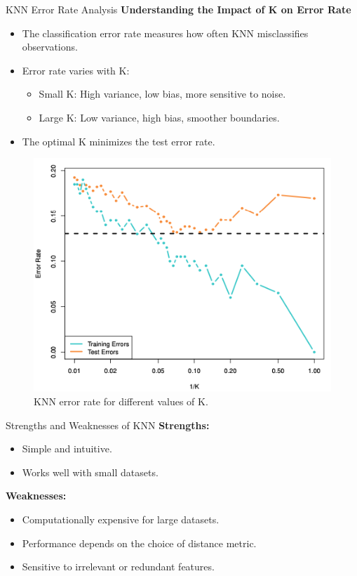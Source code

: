 \documentclass[aspectratio=169,xcolor=dvipsnames]{beamer}
\begin{document}
\begin{frame}{KNN Error Rate Analysis}
    \textbf{Understanding the Impact of K on Error Rate}
    \begin{itemize}
        \item The classification error rate measures how often KNN misclassifies observations.
        \item Error rate varies with K:
        \begin{itemize}
            \item Small K: High variance, low bias, more sensitive to noise.
            \item Large K: Low variance, high bias, smoother boundaries.
        \end{itemize}
        \item The optimal K minimizes the test error rate.
    \end{itemize}
    \begin{figure}
        \centering
        \includegraphics[width=0.3\linewidth]{images/knn_error_rate.png}
        \caption{KNN error rate for different values of K.}
    \end{figure}
\end{frame}

\begin{frame}{Strengths and Weaknesses of KNN}
    \textbf{Strengths:}
    \begin{itemize}
        \item Simple and intuitive.
        \item Works well with small datasets.
    \end{itemize}
    \textbf{Weaknesses:}
    \begin{itemize}
        \item Computationally expensive for large datasets.
        \item Performance depends on the choice of distance metric.
        \item Sensitive to irrelevant or redundant features.
    \end{itemize}
\end{frame}
\end{document}
